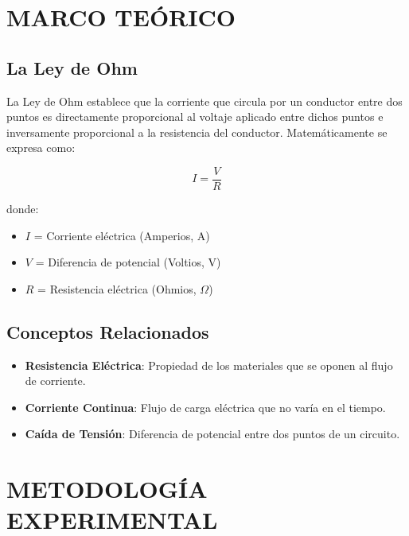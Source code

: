 \documentclass[12pt]{article}
\begin{document}
\section{MARCO TEÓRICO}
\label{sec:marco_teorico}

\subsection{La Ley de Ohm}
La Ley de Ohm establece que la corriente que circula por un conductor entre dos puntos es directamente proporcional al voltaje aplicado entre dichos puntos e inversamente proporcional a la resistencia del conductor. Matemáticamente se expresa como:

\begin{equation}
    I = \frac{V}{R}
    \label{eq:ley_ohm}
\end{equation}

donde:
\begin{itemize}
    \item $I$ = Corriente eléctrica (Amperios, A)
    \item $V$ = Diferencia de potencial (Voltios, V)
    \item $R$ = Resistencia eléctrica (Ohmios, $\Omega$)
\end{itemize}

\subsection{Conceptos Relacionados}
\begin{itemize}
    \item \textbf{Resistencia Eléctrica}: Propiedad de los materiales que se oponen al flujo de corriente.
    \item \textbf{Corriente Continua}: Flujo de carga eléctrica que no varía en el tiempo.
    \item \textbf{Caída de Tensión}: Diferencia de potencial entre dos puntos de un circuito.
\end{itemize}

\section{METODOLOGÍA EXPERIMENTAL}
\label{sec:metodologia}
\end{document}
